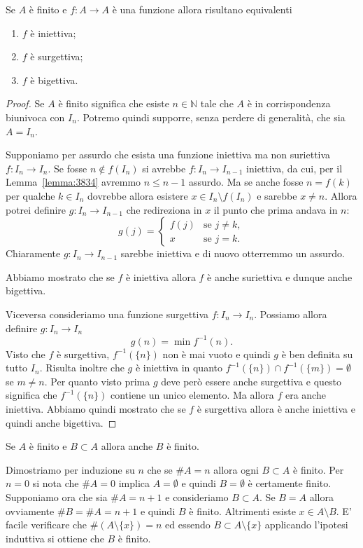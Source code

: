 \documentclass[italian,a4paper,hidelinks,headinclude]{scrartcl}
\newcommand{\NN}{{\mathbb N}}
\begin{document}
\begin{theorem}
Se $A$ è finito e $f\colon A \to A$ è una funzione allora
risultano equivalenti
\begin{enumerate}
  \item $f$ è iniettiva;
  \item $f$ è surgettiva;
  \item $f$ è bigettiva.
\end{enumerate}
\end{theorem}
%
\begin{proof}
  Se $A$ è finito significa che esiste $n\in \NN$ tale che $A$ è in
  corrispondenza biunivoca con $I_n$. Potremo quindi supporre, senza
  perdere di generalità, che sia $A=I_n$.

  Supponiamo per assurdo che esista una funzione iniettiva ma non suriettiva
  $f\colon I_n \to I_n$.
  Se fosse $n\not \in f(I_n)$ si avrebbe $f\colon I_n \to I_{n-1}$ iniettiva,
  da cui, per il Lemma~\ref{lemma:3834} avremmo $n\le n-1$ assurdo.
  Ma se anche fosse $n=f(k)$ per qualche $k\in I_n$
  dovrebbe allora esistere $x\in I_n\setminus f(I_n)$
  e sarebbe $x\neq n$.
  Allora
  potrei definire $g\colon I_n\to I_{n-1}$ che redireziona in $x$ il punto
  che prima andava in $n$:
  \[
    g(j) =
    \begin{cases}
      f(j) & \text{se $j\neq k$},\\
      x & \text{se $j=k$.}
    \end{cases}
  \]
  Chiaramente $g\colon I_n\to I_{n-1}$ sarebbe iniettiva
  e di nuovo otterremmo un assurdo.

  Abbiamo mostrato che se $f$ è iniettiva allora $f$ è anche suriettiva e dunque
  anche bigettiva.

  Viceversa consideriamo una funzione surgettiva $f\colon I_n \to I_n$.
  Possiamo allora definire $g\colon I_n\to I_n$
  \[
    g(n) = \min f^{-1}({n}).
  \]
  Visto che $f$ è surgettiva, $f^{-1}(\{n\})$ non è mai vuoto e quindi
  $g$ è ben definita su tutto $I_n$. Risulta inoltre che $g$ è iniettiva
  in quanto $f^{-1}(\{n\}) \cap f^{-1}(\{m\}) = \emptyset$ se $m\neq n$.
  Per quanto visto prima $g$ deve però essere anche surgettiva e questo
  significa che $f^{-1}(\{n\})$ contiene un unico elemento.
  Ma allora $f$ era anche iniettiva. Abbiamo quindi mostrato che se
  $f$ è surgettiva allora è anche iniettiva e quindi anche bigettiva.
\end{proof}

\begin{theorem}
  Se $A$ è finito e $B\subset A$ allora anche $B$ è finito.
\end{theorem}
%
\begin{theorem}
  Dimostriamo per induzione su $n$ che se $\#A = n$ allora ogni $B\subset A$
  è finito.
  Per $n=0$ si nota che $\#A = 0$ implica $A=\emptyset$ e quindi $B=\emptyset$
  è certamente finito.
  Supponiamo ora che sia $\#A = n+1$ e consideriamo $B\subset A$.
  Se $B=A$ allora ovviamente $\#B=\#A=n+1$ e quindi $B$ è finito.
  Altrimenti esiste $x\in A\setminus B$. E' facile verificare che
  $\#(A\setminus\{x\}) = n$ ed essendo $B\subset A\setminus\{x\}$
  applicando l'ipotesi induttiva si ottiene che $B$ è finito.
\end{theorem}
\end{document}
